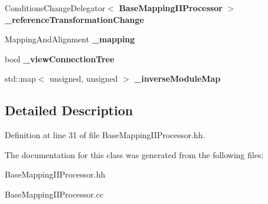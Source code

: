 \begin{DoxyCompactItemize}
\item 
ConditionsChangeDelegator$<$ {\bf BaseMappingIIProcessor} $>$ {\bfseries \_\-referenceTransformationChange}\label{classCALICE_1_1BaseMappingIIProcessor_a265f357118f9770bf12edf8c4144338f}

\item 
MappingAndAlignment {\bfseries \_\-mapping}\label{classCALICE_1_1BaseMappingIIProcessor_a41bfff962f24cc68687dcf4b482db560}

\item 
bool {\bfseries \_\-viewConnectionTree}\label{classCALICE_1_1BaseMappingIIProcessor_ae06d06bfae0591fb5f89b749f476af13}

\item 
std::map$<$ unsigned, unsigned $>$ {\bfseries \_\-inverseModuleMap}\label{classCALICE_1_1BaseMappingIIProcessor_aa4baf288fa623c98ec56a5c97e2b6b08}

\end{DoxyCompactItemize}


\subsection{Detailed Description}


Definition at line 31 of file BaseMappingIIProcessor.hh.

The documentation for this class was generated from the following files:\begin{DoxyCompactItemize}
\item 
BaseMappingIIProcessor.hh\item 
BaseMappingIIProcessor.cc\end{DoxyCompactItemize}

